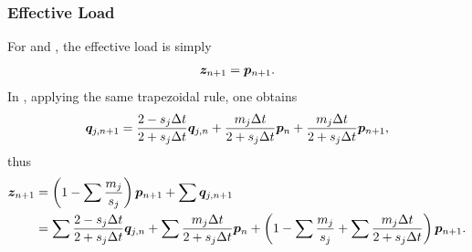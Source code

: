 \subsubsection{Effective Load}
For  and , the effective load is simply
\begin{gather}\label{eq:eff_load_simple}
    \bm{z}_{n+1}=\bm{p}_{n+1}.
\end{gather}
In , applying the same trapezoidal rule, one obtains
\begin{gather}
    \bm{q}_{j,n+1}=\dfrac{2-s_j\Delta{}t}{2+s_j\Delta{}t}\bm{q}_{j,n}+\dfrac{m_j\Delta{}t}{2+s_j\Delta{}t}\bm{p}_n+\dfrac{m_j\Delta{}t}{2+s_j\Delta{}t}\bm{p}_{n+1},
\end{gather}
thus
\begin{gather}\label{eq:eff_load}
    \begin{split}
        \bm{z}_{n+1} & =\left(1-\sum\dfrac{m_j}{s_j}\right)\bm{p}_{n+1}+\sum\bm{q}_{j,n+1}                                                                                                                             \\
                  & =\sum\dfrac{2-s_j\Delta{}t}{2+s_j\Delta{}t}\bm{q}_{j,n}+\sum\dfrac{m_j\Delta{}t}{2+s_j\Delta{}t}\bm{p}_n+\left(1-\sum\dfrac{m_j}{s_j}+\sum\dfrac{m_j\Delta{}t}{2+s_j\Delta{}t}\right)\bm{p}_{n+1}.
    \end{split}
\end{gather}
